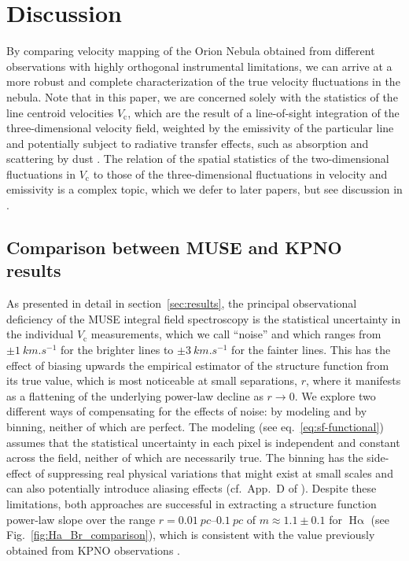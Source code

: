 \documentclass[fleqn,usenatbib, useAMS, a4paper]{mnras}
\newcommand\ha{\ensuremath{\text{H}\upalpha}}
\newcommand\Wav[1]{\ensuremath{\lambda #1}}
\newcommand\halpha{\ha}
\newcommand\n{[\ion{N}{II}] \Wav{6584}}
\newcommand\vcentroid{\ensuremath{V_{\text{c}}}}
\begin{document}


\section{Discussion}\label{sec:discussion}

By comparing velocity mapping of the Orion Nebula obtained from different observations with highly orthogonal instrumental limitations,
we can arrive at a more robust and complete characterization of the true velocity fluctuations in the nebula.
Note that in this paper, we are concerned solely with the statistics of the line centroid velocities \(\vcentroid\),
which are the result of a line-of-sight integration of the three-dimensional velocity field,
weighted by the emissivity of the particular line and potentially subject to radiative transfer effects,
such as absorption and scattering by dust \citep{1998ApJ...503..760H}.
The relation of the spatial statistics of the two-dimensional fluctuations in \(\vcentroid\)
to those of the three-dimensional fluctuations in velocity and emissivity is a complex topic,
which we defer to later papers,
but see discussion in \citet{garciav23}.

\subsection{Comparison between MUSE and KPNO results}

As presented in detail in section~\ref{sec:results},
the principal observational deficiency of the MUSE integral field spectroscopy is the
statistical uncertainty in the individual \(\vcentroid\) measurements, which we call ``noise''
and which ranges from \(\pm \qty{1}{km.s^{-1}}\) for the brighter lines
to  \(\pm \qty{3}{km.s^{-1}}\) for the fainter lines.
This has the effect of biasing upwards the empirical estimator of the structure function from its true value,
which is most noticeable at small separations, \(r\),
where it manifests as a flattening of the underlying power-law decline as \(r \to 0\).
We explore two different ways of compensating for the effects of noise: by modeling and by binning, neither of which are perfect.
The modeling (see eq.~\eqref{eq:sf-functional}) assumes that the statistical uncertainty in each pixel is independent and constant across the field,
neither of which are necessarily true.
The binning has the side-effect of suppressing real physical variations that might exist at small scales
and can also potentially introduce aliasing effects (cf.~App.~D of \citealp{Clerc:2019a}).
Despite these limitations, both approaches are successful in extracting a structure function power-law slope over the range \(r = \qtyrange{0.01}{0.1}{pc}\) of \(m \approx 1.1 \pm 0.1\)
for \halpha{} (see Fig.~\ref{fig:Ha_Br_comparison}),
which is consistent with the value previously obtained from KPNO observations
\citep{arthur2016turbulence, garciav23}.
\end{document}
